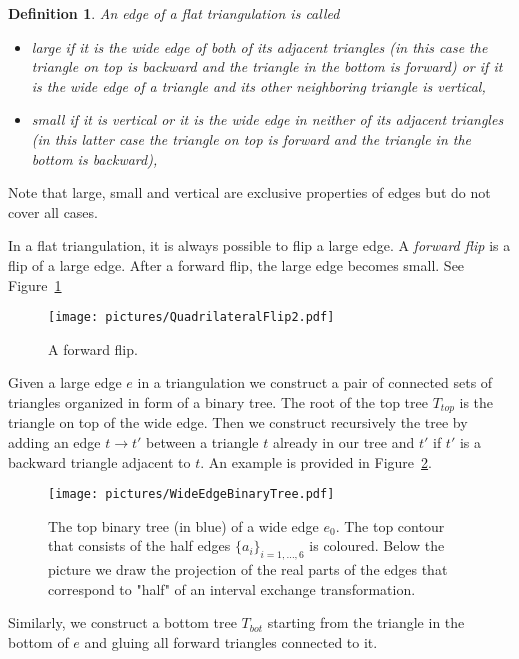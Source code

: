 \documentclass[a4paper,12pt]{article}
\newtheorem{definition}{Definition}
\begin{document}
\begin{definition}
An edge of a flat triangulation is called
\begin{itemize}
\item \emph{large} if it is the wide edge of both of its adjacent triangles (in this case
the triangle on top is backward and the triangle in the bottom is forward) or if it is the
wide edge of a triangle and its other neighboring triangle is vertical,
\item \emph{small} if it is vertical or it is the wide edge in neither of its adjacent triangles (in this latter case the triangle on top is forward and the triangle in the bottom is backward),
\end{itemize}
\end{definition}
Note that large, small and vertical are exclusive properties of edges but do
not cover all cases.

In a flat triangulation, it is always possible to flip a large edge. A
\emph{forward flip} is a flip of a large edge. After a forward flip, the large
edge becomes small. See Figure~\ref{fig:ForwardFlip}
\begin{figure}[!ht]
\begin{center}\texttt{[image: pictures/QuadrilateralFlip2.pdf]}\end{center}
\caption{A forward flip.}
\label{fig:ForwardFlip}
\end{figure}



Given a large edge $e$ in a triangulation we construct a pair of connected sets
of triangles organized in form of a binary tree. The root of the top tree
$T_{top}$ is the triangle on top of the wide edge. Then we construct
recursively the tree by adding an edge $t \to t'$ between a triangle $t$
already in our tree and $t'$ if $t'$ is a backward triangle adjacent to $t$.
An example is provided in Figure~\ref{fig:TopTree}.
\begin{figure}[!ht]
\begin{center}\texttt{[image: pictures/WideEdgeBinaryTree.pdf]}\end{center}
\caption{The top binary tree (in blue) of a wide edge $e_0$. The top contour that consists
of the half edges $\{a_i\}_{i=1,\ldots,6}$ is coloured. Below the picture we draw the
projection of the real parts of the edges that correspond to "half" of an interval
exchange transformation.}
\label{fig:TopTree}
\end{figure}
Similarly, we construct a bottom tree $T_{bot}$ starting from the
triangle in the bottom of $e$ and gluing all forward triangles connected
to it.
\end{document}
